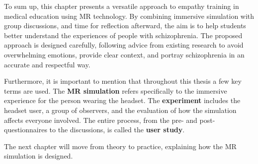 \vspace{1em}

To sum up, this chapter presents a versatile approach to empathy training in medical education using MR technology. By combining immersive simulation with group discussions, and time for reflection afterward, the aim is to help students better understand the experiences of people with schizophrenia. The proposed approach is designed carefully, following advice from existing research to avoid overwhelming emotions, provide clear context, and portray schizophrenia in an accurate and respectful way.

\vspace{1em}

Furthermore, it is important to mention that throughout this thesis a few key terms are used. The \textbf{MR simulation} refers specifically to the immersive experience for the person wearing the headset. The \textbf{experiment} includes the headset user, a group of observers, and the evaluation of how the simulation affects everyone involved. The entire process, from the pre- and post-questionnaires to the discussions, is called the \textbf{user study}.

\vspace{1em}

The next chapter will move from theory to practice, explaining how the MR simulation is designed.
